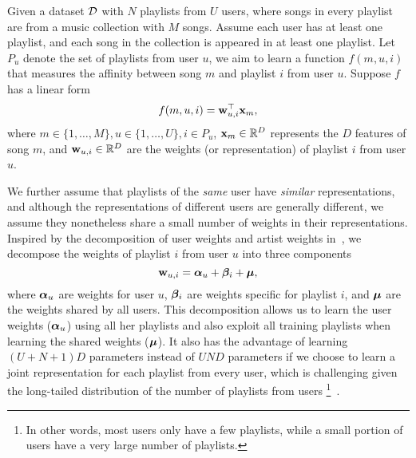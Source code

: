 Given a dataset $\mathcal{D}$ with $N$ playlists from $U$ users, 
where songs in every playlist are from a music collection with $M$ songs.
Assume each user has at least one playlist, and each song in the collection 
is appeared in at least one playlist.
%
Let $P_u$ denote the set of playlists from user $u$,
we aim to learn a function $f(m, u, i)$ that measures the affinity between song $m$ and playlist $i$ from user $u$.
Suppose $f$ has a linear form
\begin{equation}
\label{eq:scorefunc}
f(m, u, i) = \mathbf{w}_{u,i}^\top \mathbf{x}_m,
\end{equation}
where $m \in \{1,\dots,M\}, u \in \{1,\dots,U\}, i \in P_u$,
$\mathbf{x}_m \in \mathbb{R}^D$ represents the $D$ features of song $m$,
and $\mathbf{w}_{u,i} \in \mathbb{R}^D$ are the weights (or representation) of playlist $i$ from user $u$.



We further assume that playlists of the \emph{same} user have \emph{similar} representations,
and although the representations of different users are generally different,
we assume they nonetheless share a small number of weights in their representations.
Inspired by the decomposition of user weights and artist weights in~\cite{ben2017groove},
we decompose the weights of playlist $i$ from user $u$ %
into three components
$$
\mathbf{w}_{u, i} = {\bm{\alpha}}_u + {\bm{\beta}}_i + \bm{\mu},
$$
where ${\bm{\alpha}}_u$ are weights for user $u$,
${\bm{\beta}}_i$ are weights specific for playlist $i$, %
and $\bm{\mu}$ are the weights shared by all users.
This decomposition allows us to learn the user weights (\ie ${\bm{\alpha}}_u$) using all her
playlists and also exploit all training playlists when learning the shared weights (\ie $\bm{\mu}$).
It also has the advantage of learning $(U + N + 1) D$ parameters instead of $U N D$ parameters 
if we choose to learn a joint representation for each playlist from every user,
which is challenging given the long-tailed distribution
of the number of playlists from users
\footnote{In other words, most users only have a few playlists, 
while a small portion of users have a very large number of playlists.}~\cite{bonnin2013evaluating}.

